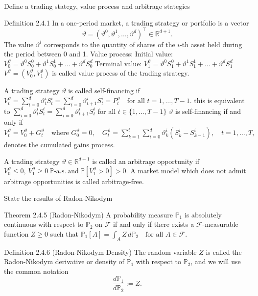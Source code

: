 Define a trading stategy, value process and arbitrage stategies

Definition 2.4.1
In a one-period market, a trading strategy or portfolio is a vector
\[
\vartheta = (\vartheta^0, \vartheta^1, \ldots, \vartheta^d)^\top \in \mathbb{R}^{d+1}. 
\]
The value \( \vartheta^i \) corresponds to the quantity of shares of the \( i \)-th asset held 
during the period between 0 and 1.
Value process:
Initial value: 
\(
V_0^\vartheta = \vartheta^0 S_0^0 + \vartheta^1 S_0^1 + \ldots + \vartheta^d S_0^d 
\)
Terminal value:
\(
V_1^\vartheta = \vartheta^0 S_1^0 + \vartheta^1 S_1^1 + \ldots + \vartheta^d S_1^d 
\)
\( V^\vartheta = (V_0^\vartheta, V_1^\vartheta) \) is called value process of the trading strategy.

A trading strategy \(\vartheta\) is called self-financing if 
\(V^\vartheta_t = \sum_{i=0}^{d} \vartheta^i_t S^i_t = \sum_{i=0}^{d} \vartheta^i_{t+1} S^i_t = P^\vartheta_t  \quad \text{for all } t = 1, \ldots, T - 1.\)
this is equivalent to \( \sum_{i=0}^d \vartheta_t^i S^i_t = \sum_{i=0}^d \vartheta_{t+1}^i S^i_t \) for all \( t \in \{1, \dots, T-1\} \)
\(\vartheta\) is self-financing if and only if 
\(V^\vartheta_t = V^\vartheta_0 + G^\vartheta_t \quad \text{where } G^\vartheta_0 = 0, \quad G^\vartheta_t = \sum_{k=1}^{t} \sum_{i=0}^{d} \vartheta^i_k (S^i_k - S^i_{k-1}), \quad t = 1, \ldots, T,\) denotes the cumulated gains process.


A trading strategy \( \vartheta \in \mathbb{R}^{d+1} \) is called an arbitrage opportunity if 
\(
V_0^\vartheta \leq 0, \ V_1^\vartheta \geq 0 \ \mathbb{P}\text{-a.s.} \ \text{and} \ \mathbb{P}[V_1^\vartheta > 0] > 0.
\)
A market model which does not admit arbitrage opportunities is called arbitrage-free.





State the results of Radon-Nikodym

Theorem 2.4.5 (Radon-Nikodym)
A probability measure \(\mathbb{P}_1\) is absolutely continuous with respect to \(\mathbb{P}_2\) on 
\(\mathcal{F}\) if and only if there exists a \(\mathcal{F}\)-measurable function \(Z \geq 0\) such that 
\(
\mathbb{P}_1[A] = \int_A Z \, d\mathbb{P}_2 \quad \text{for all } A \in \mathcal{F}.
\)

Definition 2.4.6 (Radon-Nikodym Density)
The random variable \(Z\) is called the Radon-Nikodym derivative or density of \(\mathbb{P}_1\) 
with respect to \(\mathbb{P}_2\), and we will use the common notation
\[
\frac{d\mathbb{P}_1}{d\mathbb{P}_2} := Z.
\]

